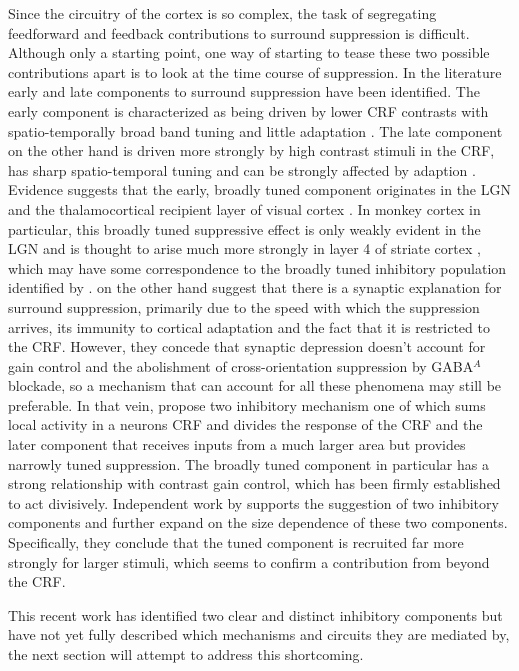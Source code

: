 Since the circuitry of the cortex is so complex, the task of
segregating feedforward and feedback contributions to surround
suppression is difficult. Although only a starting point, one
way of starting to tease these two possible contributions apart is to
look at the time course of suppression. In the literature early and
late components to surround suppression have been identified. The
early component is characterized as being driven by lower CRF
contrasts with spatio-temporally broad band tuning and little
adaptation \citep{Levitt1997,Cavanaugh2002a}. The late component on
the other hand is driven more strongly by high contrast stimuli in the
CRF, has sharp spatio-temporal tuning and can be strongly affected by
adaption \citep{Levitt1997}. Evidence suggests that the early, broadly
tuned component originates in the LGN and the thalamocortical
recipient layer of visual cortex \citep{Blasdel1984a,Hawken1996}. In
monkey cortex in particular, this broadly tuned suppressive effect is
only weakly evident in the LGN and is thought to arise much more
strongly in layer 4 of striate cortex \citep{Webb2005}, which may have
some correspondence to the broadly tuned inhibitory population
identified by \cite{Hirsch2003}. \cite{Carandini2002} on the other
hand suggest that there is a synaptic explanation for surround
suppression, primarily due to the speed with which the suppression
arrives, its immunity to cortical adaptation and the fact that it is
restricted to the CRF. However, they concede that synaptic depression
doesn't account for gain control and the abolishment of
cross-orientation suppression by GABA$^{A}$ blockade, so a mechanism
that can account for all these phenomena may still be preferable. In
that vein, \cite{Webb2005} propose two inhibitory mechanism one of
which sums local activity in a neurons CRF and divides the response of
the CRF and the later component that receives inputs from a much
larger area but provides narrowly tuned suppression. The broadly tuned
component in particular has a strong relationship with contrast gain
control, which has been firmly established to act
divisively. Independent work by \cite{Xing2005} supports the
suggestion of two inhibitory components and further expand on the size
dependence of these two components. Specifically, they conclude that
the tuned component is recruited far more strongly for larger stimuli,
which seems to confirm a contribution from beyond the CRF.

This recent work has identified two clear and distinct inhibitory
components but have not yet fully described which mechanisms and
circuits they are mediated by, the next section will attempt to
address this shortcoming.

